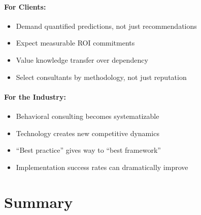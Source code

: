 \paragraph{For Clients:}
\begin{itemize}[nosep]
    \item Demand quantified predictions, not just recommendations
    \item Expect measurable ROI commitments
    \item Value knowledge transfer over dependency
    \item Select consultants by methodology, not just reputation
\end{itemize}

\paragraph{For the Industry:}
\begin{itemize}[nosep]
    \item Behavioral consulting becomes systematizable
    \item Technology creates new competitive dynamics
    \item ``Best practice'' gives way to ``best framework''
    \item Implementation success rates can dramatically improve
\end{itemize}



\section{Summary}
\label{sec:consulting-summary}

